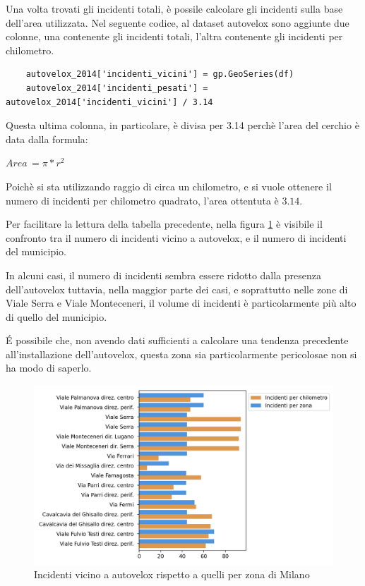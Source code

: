 \documentclass[a4paper]{report}
\begin{document}

Una volta trovati gli incidenti totali, è possile calcolare gli incidenti sulla base dell'area 
utilizzata.
Nel seguente codice, al dataset autovelox sono aggiunte due colonne, una contenente gli 
incidenti totali, l'altra contenente gli incidenti per chilometro.

\begin{lstlisting}
    autovelox_2014['incidenti_vicini'] = gp.GeoSeries(df)
    autovelox_2014['incidenti_pesati'] = autovelox_2014['incidenti_vicini'] / 3.14
\end{lstlisting}

Questa ultima colonna, in particolare, è divisa per 3.14 perchè l'area del cerchio è data dalla formula: 

\begin{center}
    $Area\, = \pi * r^2$
\end{center}

Poichè si sta utilizzando raggio di circa un chilometro, e si vuole ottenere il numero di incidenti per chilometro 
quadrato, l'area ottentuta è $3.14$.

Per facilitare la lettura della tabella precedente, nella figura \ref{fig:confronto-autovelox} è visibile il 
confronto tra il numero di incidenti vicino a autovelox, e il numero di incidenti del municipio.

In alcuni casi, il numero di incidenti sembra essere  ridotto dalla presenza dell'autovelox 
tuttavia, nella maggior parte dei casi, e soprattutto nelle zone di Viale Serra e Viale Monteceneri, 
il volume di incidenti è particolarmente più alto di quello del municipio.

\'E possibile che, non avendo dati sufficienti a calcolare una tendenza precedente all'installazione 
dell'autovelox, questa zona sia particolarmente pericolosae non si ha modo di saperlo.

\begin{figure}
    \includegraphics[width=\linewidth]{../src/municipi_milano/conclusioni_municipio.png}
    \caption{Incidenti vicino a autovelox rispetto a quelli per zona di Milano}
    \label{fig:confronto-autovelox}
\end{figure}
\end{document}
